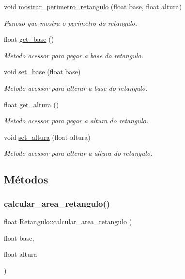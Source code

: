 \begin{DoxyCompactItemize}
void \hyperlink{classRetangulo_a321fb1a2fe5639324573d6027511dc42}{mostrar\+\_\+perimetro\+\_\+retangulo} (float base, float altura)
\begin{DoxyCompactList}\small\item\em Funcao que mostra o perimetro do retangulo. \end{DoxyCompactList}\item 
float \hyperlink{classRetangulo_a88b27fde6571b4e7c78c4bdf100075c5}{get\+\_\+base} ()
\begin{DoxyCompactList}\small\item\em Metodo acessor para pegar a base do retangulo. \end{DoxyCompactList}\item 
void \hyperlink{classRetangulo_a7f9b99e4100e568e0f78850917dbb87e}{set\+\_\+base} (float base)
\begin{DoxyCompactList}\small\item\em Metodo acessor para alterar a base do retangulo. \end{DoxyCompactList}\item 
float \hyperlink{classRetangulo_a1ae47fd4586b8830eefda98ea5052442}{get\+\_\+altura} ()
\begin{DoxyCompactList}\small\item\em Metodo acessor para pegar a altura do retangulo. \end{DoxyCompactList}\item 
void \hyperlink{classRetangulo_aec26d23f64842a87d2084ec402d6e82c}{set\+\_\+altura} (float altura)
\begin{DoxyCompactList}\small\item\em Metodo acessor para alterar a altura do retangulo. \end{DoxyCompactList}\end{DoxyCompactItemize}


\subsection{Métodos}
\mbox{\label{classRetangulo_a3de45828a7e6733968b208ebd74a7b94}} 
\subsubsection{\texorpdfstring{calcular\+\_\+area\+\_\+retangulo()}{calcular\_area\_retangulo()}}
{\footnotesize\ttfamily float Retangulo\+::calcular\+\_\+area\+\_\+retangulo (\begin{DoxyParamCaption}\item[{float}]{base,  }\item[{float}]{altura }\end{DoxyParamCaption})}



